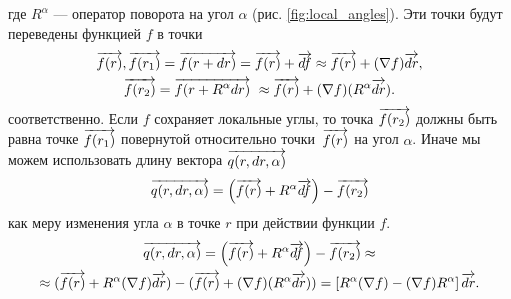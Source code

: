 где $R^\alpha$ --- оператор поворота на угол $\alpha$ (рис. \ref{fig:local_angles}). Эти точки будут переведены
функцией $f$ в точки 
\begin{multline*}
  \overrightarrow{f(r)}, 
  \overrightarrow{f(r_1)} = \overrightarrow{f(r + dr)} = \overrightarrow{f(r)} + \overrightarrow{df} \approx \overrightarrow{f(r)} + (\nabla f) \overrightarrow{dr}, \\
  \overrightarrow{f(r_2)} = \overrightarrow{f(r + R^\alpha dr)} ~\approx \overrightarrow{f(r)} + (\nabla f)(R^\alpha \overrightarrow{dr}).
\end{multline*}
соответственно. Если $f$ сохраняет локальные углы, то точка $\overrightarrow{f(r_2)}$ должны быть равна точке 
$\overrightarrow{f(r_1)}$ повернутой относительно точки~$\overrightarrow{f(r)}$ на угол $\alpha$. 
Иначе мы можем использовать длину вектора $\overrightarrow{q(r, dr, \alpha)}$
$$\overrightarrow{q(r, dr, \alpha)} = \left(\overrightarrow{f(r)} + R^\alpha \overrightarrow{df}\right) - \overrightarrow{f(r_2)}$$ 
как меру изменения угла $\alpha$ в точке $r$ при действии функции $f$.
\begin{multline}
\label{formula:angle_change_vec}
  \overrightarrow{q(r, dr, \alpha)} = \left(\overrightarrow{f(r)} + R^\alpha \overrightarrow{df} \right) - \overrightarrow{f(r_2)} \approx \\
  \approx (\overrightarrow{f(r)} + R^\alpha (\nabla f) \overrightarrow{dr}) - (\overrightarrow{f(r)} + (\nabla f)(R^\alpha \overrightarrow{dr})) =  
  \left[R^\alpha (\nabla f) - (\nabla f) R^\alpha \right] \overrightarrow{dr}. 
\end{multline}
